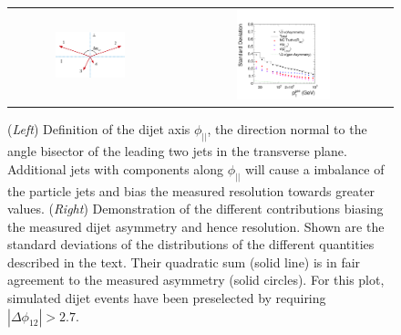 \begin{figure}[ht]
 \centering
  \begin{tabular}{cc}
    \includegraphics[width=0.45\textwidth]{figures/Sketch_Projections} &
    \includegraphics[width=0.45\textwidth]{figures/Spring10QCDDiJet_ParallelComponent_hParallelContributions} \\
 \end{tabular}
  \caption{(\textit{Left}) Definition of the dijet axis $\phi_{||}$, the direction normal to the
    angle bisector of the leading two jets in the transverse plane.
    Additional jets with \pt components along $\phi_{||}$ will cause
    a \pt imbalance of the particle jets and bias the measured
    resolution towards greater values. 
    (\textit{Right}) Demonstration of the different
    contributions biasing the measured dijet asymmetry and hence resolution.
    Shown are the standard deviations of the distributions of the
    different quantities described in the text. 
    Their quadratic sum (solid line) is in fair agreement to the
    measured asymmetry (solid circles).
    For this plot, simulated dijet events have been preselected by requiring \mbox{$|\Delta\phi_{12}| > 2.7$}.
 }
  \label{fig:ResFit:DataDriven:AddJets:Bias}
\end{figure}

